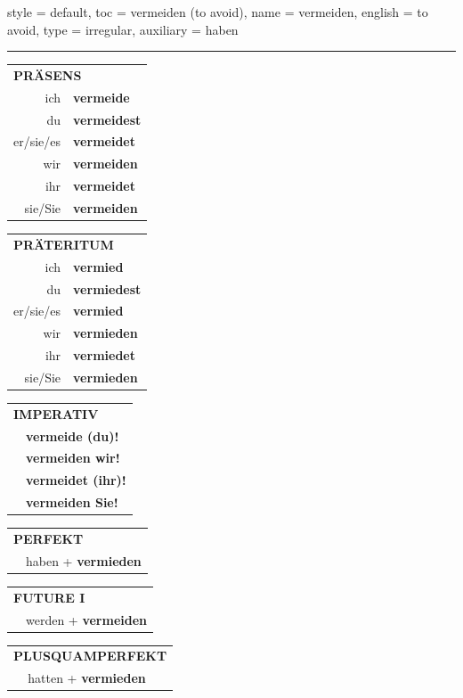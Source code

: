 \begin{verbentry}{
  style = {default},
  toc = {vermeiden (to avoid)},
  name = {vermeiden},
  english = {to avoid},
  type = {irregular},
  auxiliary = {haben}
}


\vspace{5pt}
\hrule
\vspace{5pt}

\begin{tabular}{rl}
\multicolumn{2}{l}{\textbf{PRÄSENS}}\\
ich & \textbf{vermeide}\\
du & \textbf{vermeidest}\\
er/sie/es & \textbf{vermeidet}\\
wir & \textbf{vermeiden}\\
ihr & \textbf{vermeidet}\\
sie/Sie & \textbf{vermeiden}\\
\end{tabular}
\hfill
\begin{tabular}{rl}
\multicolumn{2}{l}{\textbf{PRÄTERITUM}}\\
ich & \textbf{vermied}\\
du & \textbf{vermiedest}\\
er/sie/es & \textbf{vermied}\\
wir & \textbf{vermieden}\\
ihr & \textbf{vermiedet}\\
sie/Sie & \textbf{vermieden}\\
\end{tabular}
\hfill
\begin{tabular}{rl}
\multicolumn{2}{l}{\textbf{IMPERATIV}}\\
& \textbf{vermeide (du)!}\\
& \textbf{vermeiden wir!}\\
& \textbf{vermeidet (ihr)!}\\
& \textbf{vermeiden Sie!}\\
\end{tabular}

\vspace{10pt}

\begin{tabular}{rl}
\multicolumn{2}{l}{\textbf{PERFEKT}}\\
& haben + \textbf{vermieden}\\
\end{tabular}
\hfill
\begin{tabular}{rl}
\multicolumn{2}{l}{\textbf{FUTURE I}}\\
& werden + \textbf{vermeiden}\\
\end{tabular}
\hfill
\begin{tabular}{rl}
\multicolumn{2}{l}{\textbf{PLUSQUAMPERFEKT}}\\
& hatten + \textbf{vermieden}\\
\end{tabular}


\end{verbentry}
